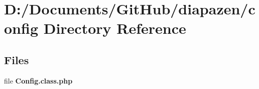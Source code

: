 \section{D\-:/\-Documents/\-Git\-Hub/diapazen/config Directory Reference}
\label{dir_77cfa062e94a83976110af85b9ae1b0a}
\subsection*{Files}
\begin{DoxyCompactItemize}
\item 
file {\bfseries Config.\-class.\-php}
\end{DoxyCompactItemize}
